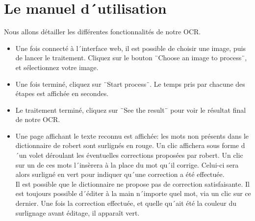 \chapter{Le manuel d´utilisation}

Nous allons détailler les différentes fonctionnalités de notre OCR.
\begin{itemize}
  \item{Une fois connecté à l´interface web, il est possible de choisir une image, puis de lancer le traitement. Cliquez sur le bouton ¨Choose an image to process¨, et sélectionnez votre image.}
  \item{Une fois terminé, cliquez sur ¨Start process¨. Le temps pris par chacune des étapes est affichée en secondes.}
  \item{Le traitement terminé, cliquez sur ¨See the result¨ pour voir le résultat final de notre OCR.}
  \item{Une page affichant le texte reconnu est affichée: les mots non présents dans le dictionnaire de robert sont surlignés en rouge. Un clic affichera sous forme d´un volet déroulant les éventuelles corrections proposées par robert. Un clic sur un de ces mots l´insèrera à la place du mot qu´il corrige. Celui-ci sera alors surligné en vert pour indiquer qu´une correction a été effectuée.\\
  Il est possible que le dictionnaire ne propose pas de correction satisfaisante. Il est toujours possible d´éditer à la main n´importe quel mot, via un clic sur ce dernier. Une fois la correction effectuée, et quelle qu´ait été la couleur du surlignage avant éditage, il apparaît vert.}
\end{itemize}
